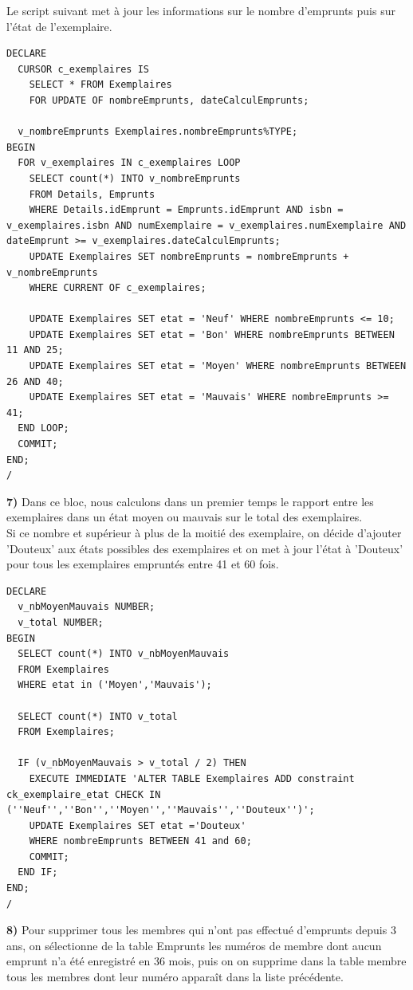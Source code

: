 \documentclass[a4paper,12pt]{article}
\begin{document}
		Le script suivant met à jour les informations sur le nombre d'emprunts puis sur l'état de l'exemplaire.
      \begin{lstlisting}
DECLARE
  CURSOR c_exemplaires IS
    SELECT * FROM Exemplaires
    FOR UPDATE OF nombreEmprunts, dateCalculEmprunts;
  
  v_nombreEmprunts Exemplaires.nombreEmprunts%TYPE;
BEGIN
  FOR v_exemplaires IN c_exemplaires LOOP
    SELECT count(*) INTO v_nombreEmprunts
    FROM Details, Emprunts
    WHERE Details.idEmprunt = Emprunts.idEmprunt AND isbn = v_exemplaires.isbn AND numExemplaire = v_exemplaires.numExemplaire AND dateEmprunt >= v_exemplaires.dateCalculEmprunts;
    UPDATE Exemplaires SET nombreEmprunts = nombreEmprunts + v_nombreEmprunts
    WHERE CURRENT OF c_exemplaires;

    UPDATE Exemplaires SET etat = 'Neuf' WHERE nombreEmprunts <= 10;
    UPDATE Exemplaires SET etat = 'Bon' WHERE nombreEmprunts BETWEEN 11 AND 25;
    UPDATE Exemplaires SET etat = 'Moyen' WHERE nombreEmprunts BETWEEN 26 AND 40;
    UPDATE Exemplaires SET etat = 'Mauvais' WHERE nombreEmprunts >= 41;
  END LOOP;
  COMMIT;
END;
/
      \end{lstlisting}

      \textbf {7)}  Dans ce bloc, nous calculons dans un premier temps le rapport entre les exemplaires dans un état moyen ou mauvais sur le total des exemplaires. \\
      Si ce nombre et supérieur à plus de la moitié des exemplaire, on décide d'ajouter 'Douteux' aux états possibles des exemplaires et on met à jour l'état à 'Douteux' pour tous les exemplaires empruntés entre 41 et 60 fois.
      
      \begin{lstlisting}
DECLARE
  v_nbMoyenMauvais NUMBER;
  v_total NUMBER;
BEGIN
  SELECT count(*) INTO v_nbMoyenMauvais
  FROM Exemplaires
  WHERE etat in ('Moyen','Mauvais');
  
  SELECT count(*) INTO v_total
  FROM Exemplaires;
  
  IF (v_nbMoyenMauvais > v_total / 2) THEN
    EXECUTE IMMEDIATE 'ALTER TABLE Exemplaires ADD constraint ck_exemplaire_etat CHECK IN (''Neuf'',''Bon'',''Moyen'',''Mauvais'',''Douteux'')';
    UPDATE Exemplaires SET etat ='Douteux'
    WHERE nombreEmprunts BETWEEN 41 and 60;
    COMMIT;
  END IF;
END;
/

      \end{lstlisting}
      
      \textbf {8)} 	Pour supprimer tous les membres qui n'ont pas effectué d'emprunts depuis 3 ans, on sélectionne de la table Emprunts les numéros de membre dont aucun emprunt n'a été enregistré en 36 mois, puis on on supprime dans la table membre tous les membres dont leur numéro apparaît dans la liste précédente. 
      
\end{document}
